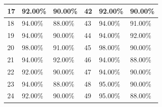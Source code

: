 \begin{table}[H]
\begin{tabular}{|l|l|l|l|l|l|}
			17 & 92.00\%                                                               & 90.00\%                                                                 & 42 & 92.00\%                                                                & 90.00\%                                                                 \\ \hline
			18 & 94.00\%                                                               & 88.00\%                                                                 & 43 & 94.00\%                                                                & 91.00\%                                                                 \\ \hline
			19 & 94.00\%                                                               & 90.00\%                                                                 & 44 & 94.00\%                                                                & 92.00\%                                                                 \\ \hline
			20 & 98.00\%                                                               & 91.00\%                                                                 & 45 & 98.00\%                                                                & 90.00\%                                                                 \\ \hline
			21 & 94.00\%                                                               & 92.00\%                                                                 & 46 & 94.00\%                                                                & 88.00\%                                                                 \\ \hline
			22 & 92.00\%                                                               & 90.00\%                                                                 & 47 & 94.00\%                                                                & 90.00\%                                                                 \\ \hline
			23 & 94.00\%                                                               & 88.00\%                                                                 & 48 & 95.00\%                                                                & 90.00\%                                                                 \\ \hline
			24 & 92.00\%                                                               & 90.00\%                                                                 & 49 & 95.00\%                                                                & 88.00\%                                                                 \\ \hline

\end{tabular}
\end{table}

